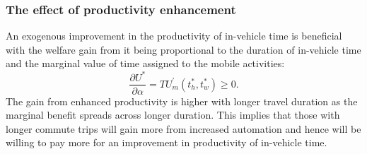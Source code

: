 \documentclass[12pt,a4paper,british]{article}
\begin{document}
\subsubsection*{The effect of productivity enhancement}
An exogenous improvement in the productivity of in-vehicle time is beneficial with the welfare gain from it being proportional to the duration of in-vehicle time and the marginal value of time assigned to the mobile activities:
\begin{equation*}
    \frac{\partial U^{\ast}}{\partial \alpha} = T U^{\prime}_m\left( t_{h}^{\ast}, t_{w}^{\ast} \right) \geq 0.
\end{equation*}
The gain from enhanced productivity is higher with longer travel duration as the marginal benefit spreads across longer duration. This implies that those with longer commute trips will gain more from increased automation and hence will be willing to pay more for an improvement in productivity of in-vehicle time.
\end{document}
